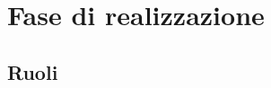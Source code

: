 \section{Fase di realizzazione}
\label{sec:fase_di_realizzazione}
\subsection{Ruoli}
\label{sub:ruoli}

